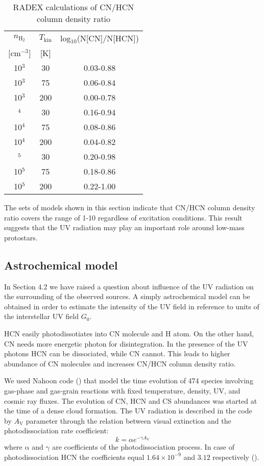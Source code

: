 \documentclass{aa}
\begin{document}
\begin{table}
\caption{RADEX calculations of CN/HCN column density ratio}             %
\label{table:5}      %
\centering                          %
\begin{tabular}{c c c} 
\hline\hline  
$n_\mathrm{H_2}$ & $T_\mathrm{kin}$ & log$_{10}$(N[CN]/N[HCN]) \\
$[$cm$^{-3}]$ & [K] & \\
\hline
10$^{3}$ & 30 & 0.03-0.88\\
10$^{3}$ & 75 & 0.06-0.84\\
10$^{3}$ & 200 & 0.00-0.78\\ \hdashline
10$^{4}$ & 30 & 0.16-0.94\\
10$^{4}$ & 75 & 0.08-0.86\\
10$^{4}$ & 200 & 0.04-0.82\\ \hdashline
10$^{5}$ & 30 & 0.20-0.98\\
10$^{5}$ & 75 & 0.18-0.86\\
10$^{5}$ & 200 & 0.22-1.00\\ \hline
\end{tabular}
\end{table} 

The sets of models shown in this section indicate that CN/HCN column density ratio covers the range of 1-10 regardless of excitation conditions. This result suggests that the UV radiation may play an important role around low-mass protostars. 

\subsection{Astrochemical model}
In Section 4.2 we have raised a question about influence of the UV radiation on the surrounding of the observed sources. A simply astrochemical model can be obtained in order to estimate the intensity of the UV field in reference to units of the interstellar UV field $G_0$.

HCN easily photodissotiates into CN molecule and H atom. On the other hand, CN needs more energetic photon for disintegration. In the presence of the UV photons HCN can be dissociated, while CN cannot. This leads to higher abundance of CN molecules and increases CN/HCN column density ratio.

We used Nahoon code (\cite{Wak12}) that model the time evolution of 474 species involving gas-phase and gas-grain reactions with fixed temperature, density, UV, and cosmic ray fluxes. The evolution of CN, HCN and CS abundances was started at the time of a dense cloud formation. The UV radiation is described in the code by $A_\mathrm{V}$ parameter through the relation between visual extinction and the photodissociation rate coefficient:
\begin{equation} \label{eq1}
k =  \alpha e^{-\gamma A_\mathrm{V}}
\end{equation}
where $\mathrm{\alpha}$ and $\mathrm{\gamma}$ are coefficients of the photodissociation process. In case of photodissociation HCN the coefficients equal $1.64\times10^{-9}$ and $3.12$ respectively (\cite{Hea17}). 
\end{document}
